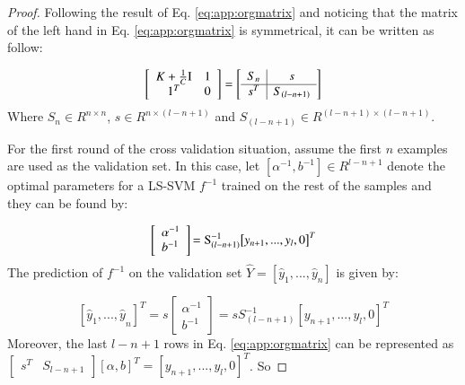\begin{proof}
	Following the result of Eq. \eqref{eq:app:orgmatrix} and noticing that the matrix of the left hand in Eq. \eqref{eq:app:orgmatrix} is symmetrical, it can be written as follow:
	
	\begin{equation}\label{eq:app:block}
	\left[ {\begin{array}{*{20}{c}}
		{K  + \frac{1}{C}{\rm I}}\\
		1^T
		\end{array}\begin{array}{*{20}{c}}
		1\\
		0
		\end{array}} \right] = \left[ {\begin{array}{c|c}
		{{S_{n }}} &s\\ \hline
		{{s^T}}&{{S_{(l - n + 1)}}}
		\end{array}} \right] 
	\end{equation}
	Where $S_{n} \in R^{n \times n}$, $s \in R^{n\times (l-n+1)}$ and $S_{(l - n + 1)} \in R^{(l - n + 1) \times (l - n + 1) }$.
	
	For the first round of the cross validation situation, assume the first $n$ examples are used as the validation set. In this case, let $\left[ {{\alpha ^{ - 1}},{b^{ - 1}}} \right] \in R^{l-n+1}$ denote the optimal parameters for a LS-SVM $f^{-1}$ trained on the rest of the samples and they can be found by:
	
	\begin{equation}\label{eq:app:ab,l-n+1}
	\left[ \begin{array}{l}
	{\alpha ^{ - 1}}\\
	{b^{ - 1}}
	\end{array} \right]{\rm{ = S}}_{(l - n + 1)}^{ - 1}{\left[ {{y_{n + 1}},...,{y_l},0} \right]^T}
	\end{equation}
	The prediction of $f^{-1}$ on the validation set $\hat{Y} = \left[\hat{y}_1,...,\hat{y}_n\right]$ is given by:
	
	\begin{equation}\label{eq:app:predict}
	\left[ {\hat {{y}}_1,...,\hat {{y}}}_n \right]^T = s\left[ {\begin{array}{*{20}{c}}
		\alpha^{-1} \\
		b^{-1}
		\end{array}} \right] = sS_{(l - n + 1)}^{ - 1}{\left[ {{y_{n + 1}},...,{y_l},0} \right]^T}
	\end{equation}
	Moreover, the last $l-n+1$ rows in Eq. \eqref{eq:app:orgmatrix} can be represented as $\left[ {\begin{array}{*{20}{c}}{{s^T}}&{{S_{l - n + 1}}}\end{array}} \right] \left[ {\alpha ,b}\right] ^T= \left[ {{y_{n + 1}},...,{y_l},0} \right]^T$. So
	

\end{proof}
